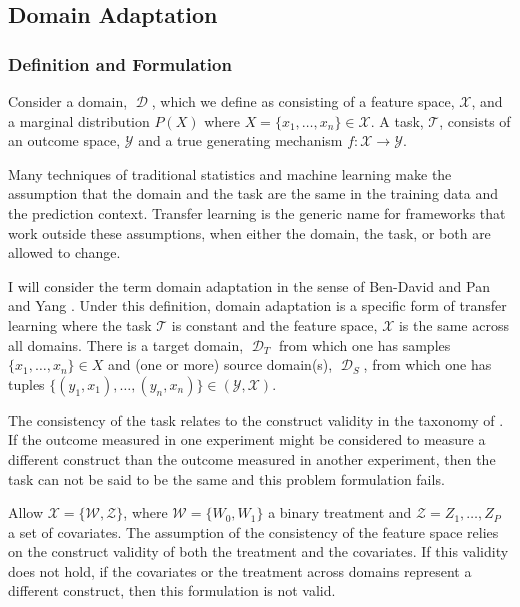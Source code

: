 \documentclass[a4paper,12pt]{article}
\DeclareMathOperator*{\D}{\mathcal{D}}
\begin{document}
\subsection{Domain Adaptation}

\subsubsection{Definition and Formulation}

Consider a domain, $\D$, which we define as consisting of a feature space, $\mathcal{X}$, and a marginal distribution $P(X)$ where $X = \{x_1,\ldots,x_n\} \in \mathcal{X}$. A task, $\mathcal{T}$, consists of an outcome space, $\mathcal{Y}$ and a true generating mechanism $f: \mathcal{X} \rightarrow \mathcal{Y}$.

Many techniques of traditional statistics and machine learning make the assumption that the domain and the task are the same in the training data and the prediction context. Transfer learning is the generic name for frameworks that work outside these assumptions, when either the domain, the task, or both are allowed to change.

I will consider the term domain adaptation in the sense of Ben-David \parencite*{Ben-David2006} and Pan and Yang \parencite*{Pan2010}. Under this definition, domain adaptation is a specific form of transfer learning where the task $\mathcal{T}$ is constant and the feature space, $\mathcal{X}$ is the same across all domains. There is a target domain, $\D_T$ from which one has samples $\{x_1,\ldots,x_n\} \in X$ and (one or more) source domain(s), $\D_S$, from which one has tuples $\{(y_1, x_1),\dots,(y_n, x_n)\} \in (\mathcal{Y}, \mathcal{X})$.

The consistency of the task relates to the construct validity in the taxonomy of \cite{Shadish2002}. If the outcome measured in one experiment might be considered to measure a different construct than the outcome measured in another experiment, then the task can not be said to be the same and this problem formulation fails.

Allow $\mathcal{X} = \{\mathcal{W}, \mathcal{Z}\}$, where $\mathcal{W} = \{W_0, W_1\}$ a binary treatment and $\mathcal{Z} = {Z_1,\ldots,Z_P}$ a set of covariates. The assumption of the consistency of the feature space relies on the construct validity of both the treatment and the covariates. If this validity does not hold, if the covariates or the treatment across domains represent a different construct, then this formulation is not valid.
\end{document}
